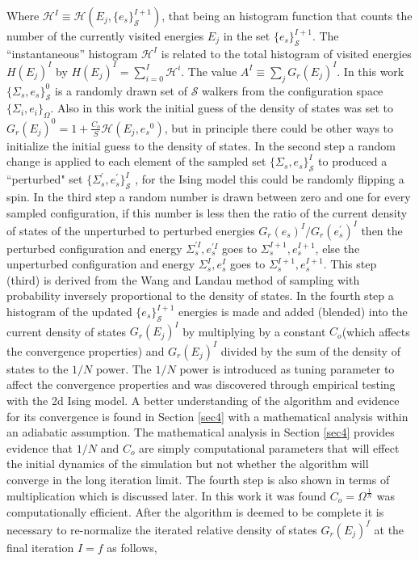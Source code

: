 \documentclass[aps,pre,reprint,superscriptaddress,showkeys]{revtex4-2}
\begin{document}
Where  $\mathcal{H}^I \equiv \mathcal{H}(E_j,\{e_s\}_{\mathcal{S}}^{I+1})$, that being an  histogram function that counts the number of the currently visited energies $E_j$ in the set $\{e_s\}_{\mathcal{S}}^{I+1}$. The ``instantaneous'' histogram $\mathcal{H}^I$ is related to the total histogram of visited energies $H(E_j)^I$ by $H(E_j)^I = \sum_{i=0}^{I}\mathcal{H}^i$. The value $A^I \equiv \sum_jG_r(E_j)^I$.  In this work $\{\Sigma_{s},e_s\}_{\mathcal{S}}^0$  is a randomly drawn set of $\mathcal{S}$ walkers from the configuration space $\{ \Sigma_i, e_i \}_\Omega $. Also in this work the initial guess of the density of states was set to $G_{r}(E_j)^0 = 1 +  \frac{C_o}{S}\mathcal{H}(E_j,{e_s}^0)$, but in principle there could be other ways to initialize the initial guess to the density of states. In the second step  a random change is applied to each element of the sampled set $\{\Sigma_{s},e_s\}_{\mathcal{S}}^I$ to produced a ``perturbed" set $ \{\Sigma_{s}^{'},e_s^{'}\}_{\mathcal{S}}^I$ , for the Ising model this could be randomly flipping a spin.  In the third step a random number is drawn between zero and one for every sampled configuration, if this number is less then the ratio of the current density of states of the unperturbed to perturbed energies $G_{r}(e_s)^{I}/G_{r}(e_s^{'})^{I}$ then the perturbed configuration and energy  $\Sigma_{s}^{'I},e_s^{'I}$  goes to $\Sigma_{s}^{I+1},e_s^{I+1}$,  else the unperturbed configuration and energy $\Sigma_{s}^{I},e_s^I$  goes to $\Sigma_{s}^{I+1},e_s^{I+1}$. This step (third) is derived from the Wang and Landau method of sampling with probability inversely proportional to the density of states.  In the fourth step a histogram of the updated $\{ e_s \}^{I+1}_{\mathcal{S}}$ energies is made and added (blended) into the current density of states $G_{r}(E_j)^I$   by multiplying  by a constant $C_{o}$(which affects the convergence properties) and   $G_{r}(E_j)^{I}$ divided by the sum of the density of states to the $1/N$ power. The $1/N$ power is introduced as tuning parameter to affect the convergence properties and was discovered through empirical testing with the 2d Ising model. A better understanding of the algorithm and evidence for its convergence is found in Section \ref{sec4} with a mathematical analysis within an adiabatic assumption.  The mathematical analysis in Section \ref{sec4} provides evidence that $1/N$ and $C_{o}$ are simply computational parameters that will effect the initial dynamics of the simulation but not whether the algorithm will converge in the long iteration limit. The fourth step is also shown in terms of multiplication which is discussed later. In this work it was found  $C_{o}=\Omega^{\frac{1}{N}}$ was computationally efficient. After the algorithm is deemed to be complete it is necessary to re-normalize the iterated relative density of states $G_{r}(E_j)^f$ at the final iteration $I=f$ as follows, 
\end{document}
